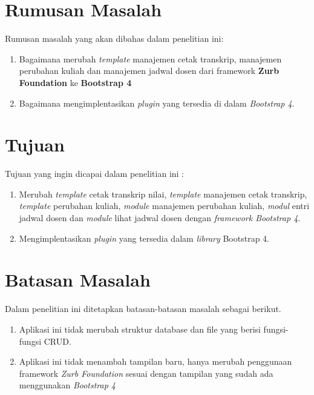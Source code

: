\section{Rumusan Masalah}
\label{sec:rumusan}
Rumusan masalah yang akan dibahas dalam penelitian ini:
\begin{enumerate}
	\item Bagaimana merubah \textit{template} manajemen cetak transkrip, manajemen perubahan kuliah dan manajemen jadwal dosen dari framework \textbf{Zurb Foundation} ke \textbf{Bootstrap 4}
	\item Bagaimana mengimplentasikan \textit{plugin} yang tersedia di dalam \textit{Bootstrap 4}.
\end{enumerate}

\section{Tujuan}
\label{sec:tujuan}
Tujuan yang ingin dicapai dalam penelitian ini :

	\begin{enumerate}	
	\item Merubah \textit{template} cetak transkrip nilai, \textit{template} manajemen cetak transkrip, \textit{template} perubahan kuliah, \textit{module} manajemen perubahan kuliah, \textit{modul} entri jadwal dosen dan \textit{module} lihat jadwal dosen dengan \textit{framework Bootstrap 4}.
	\item Mengimplentasikan \textit{plugin} yang tersedia dalam \textit{library} Bootstrap 4.
	\end{enumerate}

\section{Batasan Masalah}
\label{sec:batasan}
%
Dalam penelitian ini ditetapkan batasan-batasan masalah sebagai berikut.
\begin{enumerate}	
	\item Aplikasi ini tidak merubah struktur database dan file yang berisi fungsi-fungsi CRUD.
	\item Aplikasi ini tidak menambah tampilan baru, hanya merubah penggunaan framework \textit{Zurb Foundation} sesuai dengan tampilan yang sudah ada menggunakan \textit{Bootstrap 4}
	\end{enumerate}		


